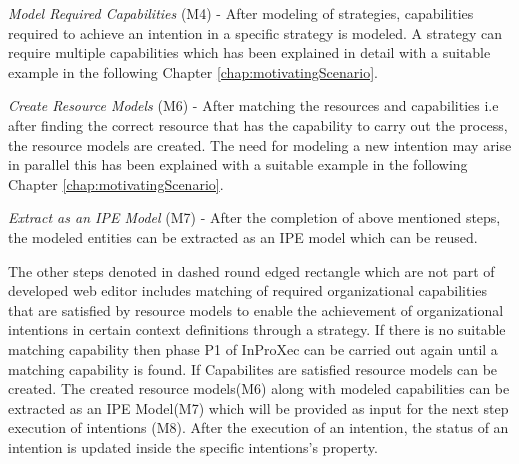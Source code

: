 \textit{Model Required Capabilities} (M4) - After modeling of strategies, capabilities required to achieve an intention in a specific strategy is modeled. A strategy can require multiple capabilities which has been explained in detail with a suitable example in the following Chapter \ref{chap:motivatingScenario}. 

\textit{Create Resource Models} (M6) -  After matching the resources and capabilities i.e after finding the correct resource that has the capability to carry out the process, the resource models are created. The need for modeling a new intention may arise in parallel this has been explained with a suitable example in the following Chapter \ref{chap:motivatingScenario}.   

\textit{Extract as an IPE Model} (M7) -  After the completion of above mentioned steps, the modeled entities can be extracted as an IPE model which can be reused. 

The other steps denoted in dashed round edged rectangle which are not part of developed web editor includes matching of required organizational capabilities that are satisfied by resource models  to enable the achievement of organizational intentions in certain context definitions through a strategy. If there is no suitable matching capability then phase P1 of InProXec can be carried out again until a matching capability is found. If Capabilites are satisfied resource models can be created. The created resource models(M6) along with modeled capabilities can be extracted as an IPE Model(M7) which will be provided as input for the next step execution of intentions (M8). After the execution of an intention, the status of an intention is updated inside the specific intentions's property. 










